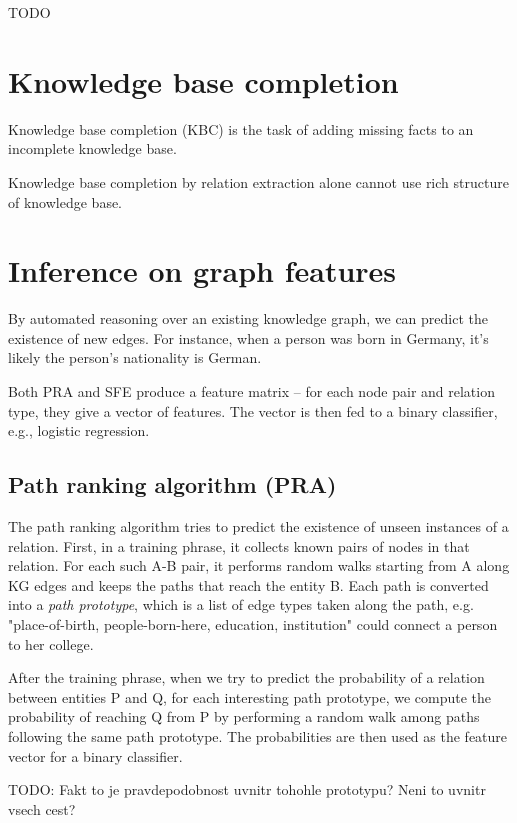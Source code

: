 TODO

\section{Knowledge base completion}

Knowledge base completion (KBC) is the task of adding missing facts to an
incomplete knowledge base.

Knowledge base completion by relation extraction alone cannot use rich structure
of knowledge base.

\section{Inference on graph features}

By automated reasoning over an existing knowledge graph, we can predict the
existence of new edges. For instance, when a person was born in Germany, it's
likely the person's nationality is German.

Both PRA and SFE produce a feature matrix -- for each node pair and relation
type, they give a vector of features. The vector is then fed to a binary
classifier, e.g., logistic regression.

\subsection{Path ranking algorithm (PRA)}
\label{path-ranking-algorithm}

The path ranking algorithm\cite{path-ranking-algorithm}
tries to predict the existence of unseen instances of a relation.
First, in a training phrase, it collects known pairs of nodes in that relation.
For each such A-B pair, it performs random walks starting from A along KG edges
and keeps the paths that reach the entity B. Each path is converted into a
\textit{path prototype}, which is a list of edge types taken along the path, e.g.
"place-of-birth, people-born-here, education, institution" could connect a
person to her college.

After the training phrase, when we try to predict the probability of a relation
between entities P and Q, for each interesting path prototype, we compute the
probability of reaching Q from P by performing a random walk among paths
following the same path prototype.
The probabilities are then used as the feature vector for a binary classifier.

TODO: Fakt to je pravdepodobnost uvnitr tohohle prototypu? Neni to uvnitr vsech
cest?

